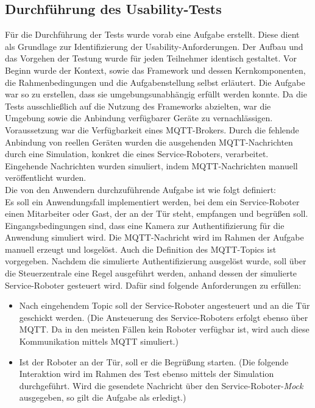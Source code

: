     \subsection{Durchführung des Usability-Tests}
        Für die Durchführung der Tests wurde vorab eine Aufgabe erstellt. Diese 
        dient als Grundlage zur Identifizierung der Usability-Anforderungen. Der Aufbau und das Vorgehen der Testung wurde für jeden Teilnehmer 
        identisch gestaltet. Vor Beginn wurde der Kontext, sowie das Framework und dessen Kernkomponenten, die Rahmenbedingungen und die Aufgabenstellung selbst erläutert. 
        Die Aufgabe war so zu erstellen, dass sie umgebungsunabhängig erfüllt werden konnte. 
        Da die Tests ausschließlich auf die Nutzung des Frameworks abzielten, war die Umgebung sowie die 
        Anbindung verfügbarer Geräte zu vernachlässigen. Voraussetzung war die Verfügbarkeit eines \acs{MQTT}-Brokers. 
        Durch die fehlende Anbindung von reellen Geräten wurden die ausgehenden 
        \acs{MQTT}-Nachrichten durch eine Simulation, konkret die eines Service-Roboters, verarbeitet. Eingehende Nachrichten 
        wurden simuliert, indem \acs{MQTT}-Nachrichten manuell veröffentlicht wurden. 
        \\
        Die von den Anwendern durchzuführende Aufgabe ist wie folgt definiert: 
        \\
        \linebreak
        Es soll ein Anwendungsfall implementiert werden, bei dem ein Service-Roboter einen Mitarbeiter oder Gast, der an der Tür steht, 
        empfangen und begrüßen soll. Eingangsbedingungen sind, dass eine Kamera zur Authentifizierung für die Anwendung simuliert wird. 
        Die \acs{MQTT}-Nachricht wird im Rahmen der Aufgabe manuell erzeugt und losgelöst. Auch die Definition des \acs{MQTT}-Topics ist vorgegeben. 
        Nachdem die simulierte Authentifizierung ausgelöst wurde, soll über die Steuerzentrale eine Regel ausgeführt werden, anhand dessen der simulierte 
        Service-Roboter gesteuert wird. Dafür sind folgende Anforderungen zu erfüllen: 
        \begin{itemize}
            \item Nach eingehendem Topic soll der Service-Roboter angesteuert und an die Tür geschickt werden. 
            (Die Ansteuerung des Service-Roboters erfolgt ebenso über \acs{MQTT}. Da in den meisten Fällen kein Roboter verfügbar ist, wird auch 
            diese Kommunikation mittels \acs{MQTT} simuliert.)
            \item Ist der Roboter an der Tür, soll er die Begrüßung starten. (Die folgende Interaktion wird im Rahmen des Test ebenso mittels der Simulation durchgeführt. 
            Wird die gesendete Nachricht über den Service-Roboter-\textit{Mock} ausgegeben, so gilt die Aufgabe als erledigt.)
        \end{itemize}
